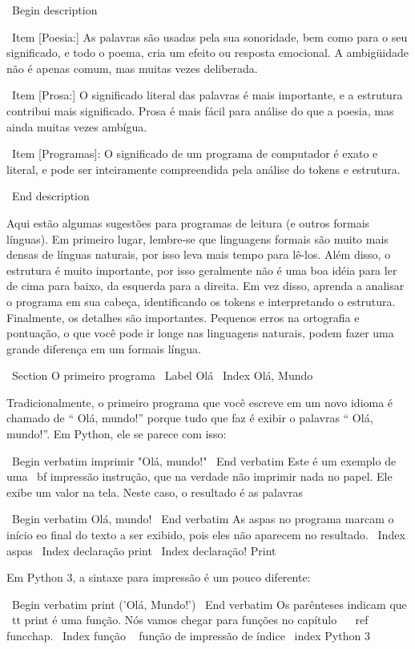\documentclass[10pt]{book}
\begin{document}
\begin {itemize}
{\ Begin {description}

\ Item [Poesia:] As palavras são usadas pela sua sonoridade, bem como para
o seu significado, e todo o poema, cria um efeito ou
resposta emocional. A ambigüidade não é apenas comum, mas muitas vezes
deliberada.

\ Item [Prosa:] O significado literal das palavras é mais importante,
e a estrutura contribui mais significado. Prosa é mais fácil para
análise do que a poesia, mas ainda muitas vezes ambígua.

\ Item [Programas]: O significado de um programa de computador é exato
e literal, e pode ser inteiramente compreendida pela análise do
tokens e estrutura.

\ End {description}

Aqui estão algumas sugestões para programas de leitura (e outros formais
línguas). Em primeiro lugar, lembre-se que linguagens formais são muito mais densas
de línguas naturais, por isso leva mais tempo para lê-los. Além disso, o
estrutura é muito importante, por isso geralmente não é uma boa idéia para ler
de cima para baixo, da esquerda para a direita. Em vez disso, aprenda a analisar o
programa em sua cabeça, identificando os tokens e interpretando o
estrutura. Finalmente, os detalhes são importantes. Pequenos erros na
ortografia e pontuação, o que você pode ir longe
nas linguagens naturais, podem fazer uma grande diferença em um formais
língua.


\ Section {O primeiro programa}
\ Label {Olá}
\ Index {Olá, Mundo}

Tradicionalmente, o primeiro programa que você escreve em um novo idioma
é chamado de `` Olá, mundo!'' porque tudo que faz é exibir o
palavras `` Olá, mundo!''. Em Python, ele se parece com isso:

\ Begin {verbatim}
imprimir "Olá, mundo!"
\ End {verbatim}
%
Este é um exemplo de uma {\ bf impressão instrução}, que
na verdade não imprimir nada no papel. Ele exibe um valor na
tela. Neste caso, o resultado é as palavras

\ Begin {verbatim}
Olá, mundo!
\ End {verbatim}
%
As aspas no programa marcam o início eo final
do texto a ser exibido, pois eles não aparecem no resultado.
\ Index {aspas}
\ Index {declaração print}
\ Index {declaração! Print}

Em Python 3, a sintaxe para impressão é um pouco diferente:

\ Begin {verbatim}
print ('Olá, Mundo!')
\ End {verbatim}
%
Os parênteses indicam que {\ tt print} é uma função. Nós vamos chegar
para funções no capítulo ~ \ ref {} funcchap.
\ Index {função} \ {} função de impressão de índice \ index {Python 3}

}
\end{itemize}
\end{document}
